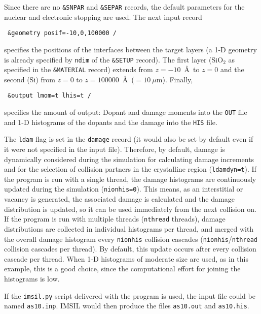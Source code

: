 Since there are no \texttt{\&SNPAR} and \texttt{\&SEPAR} records, the default
parameters for the nuclear and electronic stopping are used. The next input
record 
%
\begin{verbatim}
 &geometry posif=-10,0,100000 /
\end{verbatim}
%
specifies the positions of the interfaces between the target layers
(a 1-D geometry is already specified by \texttt{ndim} of the \texttt{\&SETUP}
record). The first layer (SiO$_2$ as specified in the \texttt{\&MATERIAL}
record) extends from $z=-10$~\AA\ to $z=0$ and the second (Si) from $z=0$ to
$z=100000$~\AA\ ($=10~\mu$m). Finally,
%
\begin{verbatim}
 &output lmom=t lhis=t /
\end{verbatim}
%
specifies the amount of output: Dopant and damage moments into the {\tt OUT}
file and 1-D histograms of the dopants and the damage into the \texttt{HIS}
file.

The \texttt{ldam} flag is set in the \texttt{damage} record (it would also
be set by default even if it were not specified in the input file). 
Therefore, by default, damage is dynamically considered during the
simulation for calculating damage increments and for the selection of collision
partners in the crystalline region (\texttt{ldamdyn=t}).
If the program is run with a single thread, the damage histograms are
continuously updated during the simulation (\texttt{nionhis=0}). 
This means, as an interstitial or vacancy is generated, the associated damage is
calculated and the damage distribution is updated, so it can be used immediately
from the next collision on. 
If the program is run with multiple threads (\texttt{nthread} threads), damage
distributions are collected in individual histograms per thread, and merged
with the overall damage histogram every \texttt{nionhis} collision cascades
(\texttt{nionhis}/\texttt{nthread} collision cascades per thread). 
By default, this update occurs after every collision cascade per thread.
When 1-D histograms of moderate size are used, as in this example, this is a
good choice, since the computational effort for joining the histograms is low.

If the \texttt{imsil.py} script delivered with the program is used, the input
file could be named \texttt{as10.inp}. IMSIL would then produce the files
\texttt{as10.out} and \texttt{as10.his}.

